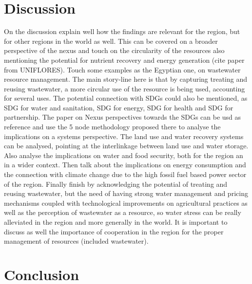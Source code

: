 \documentclass[12pt]{iopart}
\begin{document}
\section{Discussion}
On the discussion  explain well how the findings are relevant for the region, but for other regions in the world as well. This can be covered on a broader perspective of the nexus and touch on the circularity of the resources also mentioning the potential for nutrient recovery and energy generation (cite paper from UNIFLORES). Touch some examples as the Egyptian one, on wastewater resource management. The main story-line here is that by capturing treating and reusing wastewater, a more circular use of the resource is being used, accounting for several uses. The potential connection with SDGs could also be mentioned, as SDG for water and sanitation, SDG for energy, SDG for health and SDG for partnership. The paper on Nexus perspectives towards the SDGs can be usd as reference and use the 5 node methodology proposed there to analyse the implications on a systems perspective. The land use and water recovery systems can be analysed, pointing at the interlinkage between land use and water storage. Also analyse the implications on water and food security, both for the region an in a wider context. Then talk about the implications on energy consumption and the connection with climate change due to the high fossil fuel based power sector of the region. Finally finish by acknowledging the potential of treating and reusing wastewater, but the need of having strong water management and pricing mechanisms coupled with technological improvements on agricultural practices as well as the perception of wastewater as a resource, so water stress can be really alleviated in the region and more generally in the world. It is important to discuss as well the importance of cooperation in the region for the proper management of resources (included wastewater).

\section{Conclusion}

\newpage
\newcommand{\newblock}{}


\end{document}
